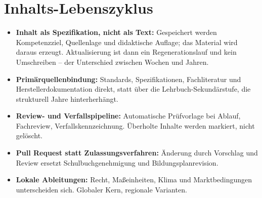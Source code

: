 \documentclass[11pt,a4paper]{article}
\begin{document}
\section{Inhalts-Lebenszyklus}
\label{sec:lebenszyklus}
\begin{itemize}[label=--]
    \item \textbf{Inhalt als Spezifikation, nicht als Text:} Gespeichert werden Kompetenzziel, Quellenlage und didaktische Auflage; das Material wird daraus erzeugt. Aktualisierung ist dann ein Regenerationslauf und kein Umschreiben -- der Unterschied zwischen Wochen und Jahren.
    \item \textbf{Primärquellenbindung:} Standards, Spezifikationen, Fachliteratur und Herstellerdokumentation direkt, statt über die Lehrbuch-Sekundärstufe, die strukturell Jahre hinterherhängt.
    \item \textbf{Review- und Verfallspipeline:} Automatische Prüfvorlage bei Ablauf, Fachreview, Verfallskennzeichnung. Überholte Inhalte werden markiert, nicht gelöscht.
    \item \textbf{Pull Request statt Zulassungsverfahren:} Änderung durch Vorschlag und Review ersetzt Schulbuchgenehmigung und Bildungsplanrevision.
    \item \textbf{Lokale Ableitungen:} Recht, Maßeinheiten, Klima und Marktbedingungen unterscheiden sich. Globaler Kern, regionale Varianten.
\end{itemize}
\end{document}
